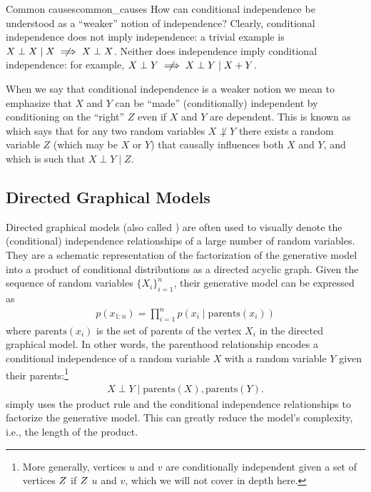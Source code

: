\begin{rmk}{Common causes}{common_causes}
  How can conditional independence be understood as a ``weaker'' notion of independence?
  Clearly, conditional independence does not imply independence: a trivial example is $X \perp X \mid X \centernot\implies X \perp X$.
  Neither does independence imply conditional independence: for example, $X \perp Y \centernot\implies X \perp Y \mid X + Y$.

  When we say that conditional independence is a weaker notion we mean to emphasize that $X$ and $Y$ can be ``made'' (conditionally) independent by conditioning on the ``right'' $Z$ even if $X$ and $Y$ are dependent.
  This is known as  which says that for any two random variables $X \not\perp Y$ there exists a random variable $Z$ (which may be $X$ or $Y$) that causally influences both $X$ and $Y$, and which is such that $X \perp Y \mid Z$.
\end{rmk}


\subsection{Directed Graphical Models}%

Directed graphical models (also called ) are often used to visually denote the (conditional) independence relationships of a large number of random variables.
They are a schematic representation of the factorization of the generative model into a product of conditional distributions as a directed acyclic graph.
Given the sequence of random variables $\{X_i\}_{i=1}^n$, their generative model can be expressed as \begin{align}
  p(x_{1:n}) = \prod_{i=1}^n p(x_i \mid \mathrm{parents}(x_i)) \label{eq:directed_graphical_model}
\end{align} where $\mathrm{parents}(x_i)$ is the set of parents of the vertex $X_i$ in the directed graphical model.
In other words, the parenthood relationship encodes a conditional independence of a random variable $X$ with a random variable $Y$ given their parents:\footnote[][-5\baselineskip]{More generally, vertices $u$ and $v$ are conditionally independent given a set of vertices $Z$ if $Z$  $u$ and $v$, which we will not cover in depth here.} \begin{align}
    X \perp Y \mid \mathrm{parents}(X), \mathrm{parents}(Y).
\end{align}
 simply uses the product rule and the conditional independence relationships to factorize the generative model.
This can greatly reduce the model's complexity, i.e., the length of the product.

